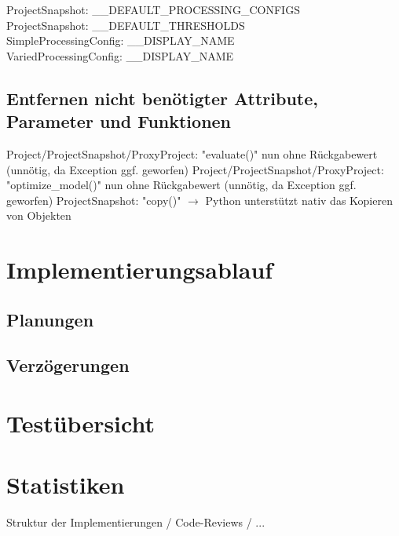 \documentclass{article}
\begin{document}
ProjectSnapshot: \_\_DEFAULT\_PROCESSING\_CONFIGS\\
ProjectSnapshot: \_\_DEFAULT\_THRESHOLDS\\
SimpleProcessingConfig: \_\_DISPLAY\_NAME\\
VariedProcessingConfig: \_\_DISPLAY\_NAME\\

\subsection{Entfernen nicht benötigter Attribute, Parameter und Funktionen}

Project/ProjectSnapshot/ProxyProject: "evaluate()" nun ohne Rückgabewert (unnötig, da Exception ggf. geworfen)
Project/ProjectSnapshot/ProxyProject: "optimize\_model()" nun ohne Rückgabewert (unnötig, da Exception ggf. geworfen)
ProjectSnapshot: "copy()" $\rightarrow$ Python unterstützt nativ das Kopieren von Objekten\\

\section{Implementierungsablauf}

\subsection{Planungen}


\subsection{Verzögerungen}



\section{Testübersicht}


\section{Statistiken}


Struktur der Implementierungen / Code-Reviews / ...

\clearpage
\printunsrtglossary
\end{document}
